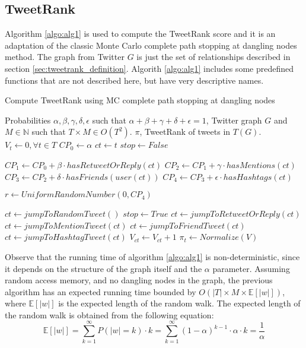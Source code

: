 \subsection{TweetRank}\label{sec:tweetrank_implementation}
Algorithm \ref{algo:alg1} is used to compute the TweetRank score and it is an adaptation of the classic Monte Carlo complete path stopping at dangling nodes method. The graph from Twitter $G$ is just the set of relationships described in section \ref{sec:tweetrank_definition}. Algorith \ref{algo:alg1} includes some predefined functions that are not described here, but have very descriptive names.

\begin{algorithm}
\caption{Compute TweetRank using MC complete path stopping at dangling nodes}
\label{algo:alg1}
{\fontsize{8}{8}\selectfont
\begin{algorithmic}
\REQUIRE Probabilities $\alpha, \beta, \gamma, \delta, \epsilon$ such that $\alpha+\beta+\gamma+\delta+\epsilon=1$, Twitter graph $G$ and $M \in \mathbb{N}$ such that $T\times M \in O(T^2)$.
\ENSURE $\pi$, TweetRank of tweets in $T(G)$.
\STATE $V_t \leftarrow 0, \forall t \in T$ 
\STATE $CP_0 \leftarrow \alpha$ 
\STATE $ct \leftarrow t$
\STATE $stop \leftarrow False$

\STATE $CP_1 \leftarrow CP_0 + \beta \cdot hasRetweetOrReply(ct)$
\STATE $CP_2 \leftarrow CP_1 + \gamma \cdot hasMentions(ct)$
\STATE $CP_3 \leftarrow CP_2 + \delta \cdot hasFriends(user(ct))$
\STATE $CP_4 \leftarrow CP_3 + \epsilon \cdot hasHashtags(ct)$

\STATE $r \leftarrow UniformRandomNumber(0, CP_4)$ 

\STATE $ct \leftarrow jumpToRandomTweet()$
\STATE $stop \leftarrow True$
\STATE $ct \leftarrow jumpToRetweetOrReply(ct)$
\STATE $ct \leftarrow jumpToMentionTweet(ct)$
\STATE $ct \leftarrow jumpToFriendTweet(ct)$
\ELSE
\STATE $ct \leftarrow jumpToHashtagTweet(ct)$
\ENDIF
\STATE $V_{ct} \leftarrow V_{ct} + 1$ 
\ENDWHILE
\ENDFOR
\ENDFOR
\STATE $\pi_t \leftarrow Normalize(V)$ 
\end{algorithmic}}
\end{algorithm}

Observe that the running time of algorithm \ref{algo:alg1} is non-deterministic, since it depends on the structure of the graph itself and the $\alpha$ parameter. Assuming random access memory, and no dangling nodes in the graph, the previous algorithm has an expected running time bounded by $O(|T| \times M \times \mathbb{E}[|w|])$, where $\mathbb{E}[|w|]$ is the expected length of the random walk. The expected length of the random walk is obtained from the following
equation:
\begin{equation}
\mathbb{E}[|w|] = \sum_{k=1}^{\infty} P(|w| = k) \cdot k = \sum_{k=1}^{\infty} (1 - \alpha)^{k-1} \cdot \alpha \cdot k = \frac{1}{\alpha}
\end{equation}

